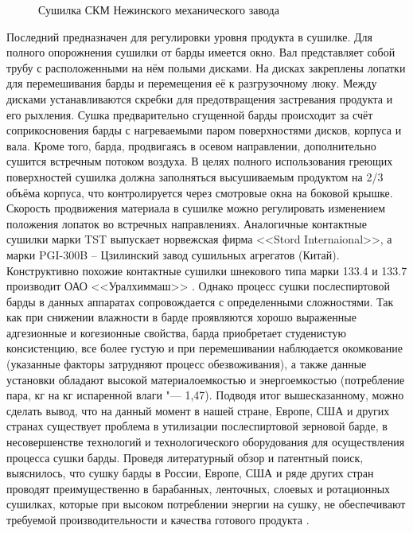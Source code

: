 {\begin{figure} 
\centering 
\begin{footnotesize} 
\def\svgwidth{0.95\linewidth} 
 
\end{footnotesize} 
\caption{Сушилка СКМ Нежинского механического завода} 
\label{CKM} 
\end{figure} 

Последний предназначен для регулировки уровня продукта в сушилке. 
Для полного опорожнения сушилки от барды имеется окно. 
Вал представляет собой трубу с расположенными на нём полыми дисками. 
На дисках закреплены лопатки для перемешивания барды и перемещения её к разгрузочному люку. Между дисками устанавливаются скребки для предотвращения застревания продукта и его рыхления. 
Сушка предварительно сгущенной барды происходит за счёт соприкосновения барды с нагреваемыми паром поверхностями дисков, корпуса и вала. 
Кроме того, барда, продвигаясь в осевом направлении, дополнительно сушится встречным потоком воздуха. 
В целях полного использования греющих поверхностей сушилка должна заполняться высушиваемым продуктом на 2/3 объёма корпуса, что контролируется через смотровые окна на боковой крышке. 
Скорость продвижения материала в сушилке можно регулировать изменением положения лопаток во встречных направлениях.
 Аналогичные контактные сушилки марки TST выпускает норвежская фирма <<Stord Internaional>>, а марки PGI-300B -- Цзилинский завод сушильных агрегатов (Китай). 
Конструктивно похожие контактные сушилки шнекового типа марки 133.4 и 133.7 производит ОАО <<Уралхиммаш>> \cite{Korman_2003_7_Journal}. 
Однако процесс сушки послеспиртовой барды в данных аппаратах сопровождается с определенными сложностями. 
Так как при снижении влажности в барде проявляются хорошо выраженные адгезионные и когезионные свойства, барда приобретает студенистую консистенцию, все более густую и при перемешивании наблюдается окомкование (указанные факторы затрудняют процесс обезвоживания), а также данные установки обладают высокой материалоемкостью и энергоемкостью (потребление пара, кг на кг испаренной влаги "--- 1,47). 
Подводя итог вышесказанному, можно сделать вывод, что на данный момент в нашей стране, Европе, США и других странах существует проблема в утилизации послеспиртовой зерновой барде, в несовершенстве технологий и технологического оборудования для осуществления процесса сушки барды. 
Проведя литературный обзор и патентный поиск, выяснилось, что сушку барды в России, Европе, США и ряде других стран проводят преимущественно в барабанных, ленточных, слоевых и ротационных сушилках, которые при высоком потреблении энергии на сушку, не обеспечивают требуемой производительности и качества готового продукта \cite{Antipov_2005_2_Journal,Zhuravlev_2004}. 
}
